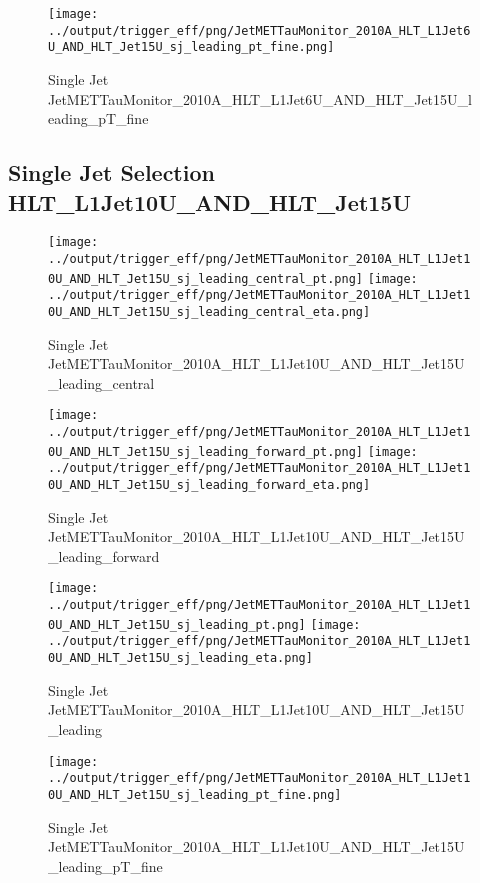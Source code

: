 \documentclass[11pt]{article}
\begin{document}
\begin{figure}[ht]
\centering
\texttt{[image: ../output/trigger\_eff/png/JetMETTauMonitor\_2010A\_HLT\_L1Jet6U\_AND\_HLT\_Jet15U\_sj\_leading\_pt\_fine.png]}
\caption{Single Jet JetMETTauMonitor\_2010A\_HLT\_L1Jet6U\_AND\_HLT\_Jet15U\_leading\_pT\_fine}
\label{fig:jetmettaumon_sj_HLT_L1Jet6U_AND_HLT_Jet15U_leading_pT_fine}
\end{figure}
\clearpage


\newpage
\subsection{Single Jet Selection HLT\_L1Jet10U\_AND\_HLT\_Jet15U}
\begin{figure}[ht]
\centering
\texttt{[image: ../output/trigger\_eff/png/JetMETTauMonitor\_2010A\_HLT\_L1Jet10U\_AND\_HLT\_Jet15U\_sj\_leading\_central\_pt.png]}
\texttt{[image: ../output/trigger\_eff/png/JetMETTauMonitor\_2010A\_HLT\_L1Jet10U\_AND\_HLT\_Jet15U\_sj\_leading\_central\_eta.png]}
\caption{Single Jet JetMETTauMonitor\_2010A\_HLT\_L1Jet10U\_AND\_HLT\_Jet15U\_leading\_central}
\label{fig:jetmettaumon_sj_HLT_L1Jet10U_AND_HLT_Jet15U_leading_central}
\end{figure}

\begin{figure}[ht]
\centering
\texttt{[image: ../output/trigger\_eff/png/JetMETTauMonitor\_2010A\_HLT\_L1Jet10U\_AND\_HLT\_Jet15U\_sj\_leading\_forward\_pt.png]}
\texttt{[image: ../output/trigger\_eff/png/JetMETTauMonitor\_2010A\_HLT\_L1Jet10U\_AND\_HLT\_Jet15U\_sj\_leading\_forward\_eta.png]}
\caption{Single Jet JetMETTauMonitor\_2010A\_HLT\_L1Jet10U\_AND\_HLT\_Jet15U\_leading\_forward}
\label{fig:jetmettaumon_sj_HLT_L1Jet10U_AND_HLT_Jet15U_leading_forward}
\end{figure}

\begin{figure}[ht]
\centering
\texttt{[image: ../output/trigger\_eff/png/JetMETTauMonitor\_2010A\_HLT\_L1Jet10U\_AND\_HLT\_Jet15U\_sj\_leading\_pt.png]}
\texttt{[image: ../output/trigger\_eff/png/JetMETTauMonitor\_2010A\_HLT\_L1Jet10U\_AND\_HLT\_Jet15U\_sj\_leading\_eta.png]}
\caption{Single Jet JetMETTauMonitor\_2010A\_HLT\_L1Jet10U\_AND\_HLT\_Jet15U\_leading}
\label{fig:jetmettaumon_sj_HLT_L1Jet10U_AND_HLT_Jet15U_leading}
\end{figure}

\begin{figure}[ht]
\centering
\texttt{[image: ../output/trigger\_eff/png/JetMETTauMonitor\_2010A\_HLT\_L1Jet10U\_AND\_HLT\_Jet15U\_sj\_leading\_pt\_fine.png]}
\caption{Single Jet JetMETTauMonitor\_2010A\_HLT\_L1Jet10U\_AND\_HLT\_Jet15U\_leading\_pT\_fine}
\label{fig:jetmettaumon_sj_HLT_L1Jet10U_AND_HLT_Jet15U_leading_pT_fine}
\end{figure}
\clearpage
\end{document}
